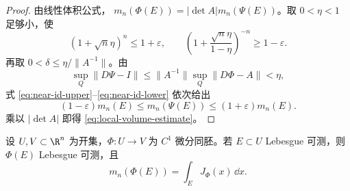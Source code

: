 \begin{proof}
由线性体积公式，
$m_n(\Phi(E))=|\det A|m_n(\Psi(E))$。取 $0<\eta<1$ 足够小，使
\[
 (1+\sqrt n\eta)^n\le1+\varepsilon,
 \qquad
 \left(1+\frac{\sqrt n\eta}{1-\eta}\right)^{-n}\ge1-\varepsilon.
\]
再取 $0<\delta\le\eta/\|A^{-1}\|$。由
\[
 \sup_Q\|D\Psi-I\|
 \le\|A^{-1}\|\sup_Q\|D\Phi-A\|<\eta,
\]
式 \eqref{eq:near-id-upper}--\eqref{eq:near-id-lower} 依次给出
\[
 (1-\varepsilon)m_n(E)\le m_n(\Psi(E))
 \le(1+\varepsilon)m_n(E).
\]
乘以 $|\det A|$ 即得 \eqref{eq:local-volume-estimate}。
\end{proof}

\begin{theorem}[集合换元公式]\label{theorem:3-2-2-2}
设 $U,V\subset\R^n$ 为开集，$\Phi:U\to V$ 为 $C^1$ 微分同胚。若
$E\subset U$ Lebesgue 可测，则 $\Phi(E)$ Lebesgue 可测，且
\[
 m_n(\Phi(E))=\int_EJ_\Phi(x)\,\dd x.
 \tag{3.2.12}\label{eq:set-change-variables}
\]
\end{theorem}

